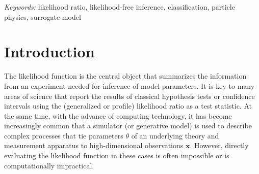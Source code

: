 \documentclass[12pt]{article}
\numberwithin{equation}{section}
\theoremstyle{plain}
\begin{document}
\noindent%
{\it Keywords:}  likelihood ratio, likelihood-free inference, classification, particle physics, surrogate model
\vfill

\newpage
{} %




\section{Introduction}
\label{sec:introduction}


The likelihood function is the central object that summarizes the information
from an experiment needed for inference of model parameters. It
is key to many areas of science that report the results of classical
hypothesis tests or confidence intervals using the (generalized or profile)
likelihood ratio as a test statistic. At the same time, with the advance of
computing technology, it has become increasingly common that a simulator (or
generative model) is used to describe complex processes that tie parameters
$\theta$ of an underlying theory and measurement apparatus to high-dimensional
observations $\mathbf{x}$. However, directly evaluating the likelihood function
in these cases is often impossible or is computationally impractical.
\end{document}
